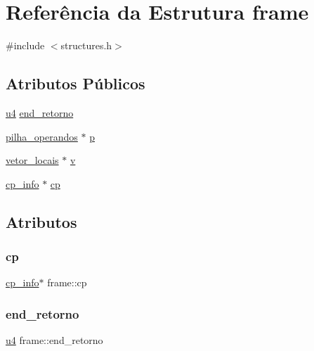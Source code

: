 \hypertarget{structframe}{}\section{Referência da Estrutura frame}
\label{structframe}


{\ttfamily \#include $<$structures.\+h$>$}

\subsection*{Atributos Públicos}
\begin{DoxyCompactItemize}
\item 
\hyperlink{lista__operandos_8h_ae5be1f726785414dd1b77d60df074c9d}{u4} \hyperlink{structframe_a5d2f3ff696847f4147ff799395a331fc}{end\+\_\+retorno}
\item 
\hyperlink{structpilha__operandos}{pilha\+\_\+operandos} $\ast$ \hyperlink{structframe_a6aa3e7c39989aa1477fd946643f521fe}{p}
\item 
\hyperlink{structvetor__locais}{vetor\+\_\+locais} $\ast$ \hyperlink{structframe_a01ae11b1517de21c420c3c9a6a267401}{v}
\item 
\hyperlink{structcp__info}{cp\+\_\+info} $\ast$ \hyperlink{structframe_a93acb5bd67bf7dbfd2605c2d5c4c76c5}{cp}
\end{DoxyCompactItemize}


\subsection{Atributos}
\mbox{\label{structframe_a93acb5bd67bf7dbfd2605c2d5c4c76c5}} 
\subsubsection{\texorpdfstring{cp}{cp}}
{\footnotesize\ttfamily \hyperlink{structcp__info}{cp\+\_\+info}$\ast$ frame\+::cp}

\mbox{\label{structframe_a5d2f3ff696847f4147ff799395a331fc}} 
\subsubsection{\texorpdfstring{end\+\_\+retorno}{end\_retorno}}
{\footnotesize\ttfamily \hyperlink{lista__operandos_8h_ae5be1f726785414dd1b77d60df074c9d}{u4} frame\+::end\+\_\+retorno}

